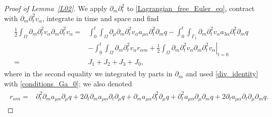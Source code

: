 \documentclass[10pt,reqno]{amsart}
\theoremstyle{plain}
\theoremstyle{definition}
\numberwithin{equation}{section}
\newcommand{\al}{\alpha}
\newcommand{\Ga}{\Gamma}
\newcommand{\Om}{\Omega}
\newcommand{\norm}[1]{\Vert#1\Vert}
\begin{document}
\begin{proof}[Proof of Lemma~\ref{L02}]
We apply $\partial_m \partial^2_t$ to \eqref{Lagrangian_free_Euler_eq}, contract with
$\partial_m \partial^2_t v_\al$, integrate in time and space and find
\begin{align}
\begin{split}
\frac{1}{2} \int_\Om \partial_m \partial^2_t v_\al \partial_m \partial^2_t v_\al 
= & 
\int_0^t \int_\Om  \partial_\mu \partial_m \partial^2_t v_\al a_{\mu\al} \partial^2_t \partial_m q 
- \int_0^t \int_{\Ga_1} \partial_m \partial^2_t v_\al a_{3 \al} \partial^2_t \partial_m q
\\
&
 - \int_0^t \int_\Om \partial_m \partial^2_t v_\al r_{\al m}
 +\left. \frac{1}{2} \int_\Om \partial_m \partial^2_t v_\al \partial_m \partial^2_t v_\al 
\right|_{t=0} 
\\
=& J_1 + J_2 + J_3 + J_0
,
\end{split}
\nonumber
\end{align}
where in the second equality we integrated by parts in $\partial_{m}$
and used \eqref{div_identity} with \eqref{conditions_Ga_0}; 
we also denoted
\begin{align}
\begin{split}
r_{\al m} = & \partial^2_t \partial_m a_{\mu\al}\partial_\mu q
+ 2 \partial_t \partial_m a_{\mu \al} \partial_t \partial_\mu q
+ \partial_m a_{\mu\al} \partial^2_t \partial_\mu q + \partial^2_t a_{\mu \al} \partial_\mu 
\partial_m q
+ 2 \partial_t a_{\mu \al}\partial_t \partial_\mu \partial_m q.
\end{split}
\nonumber
\end{align}

\end{proof}
\end{document}
